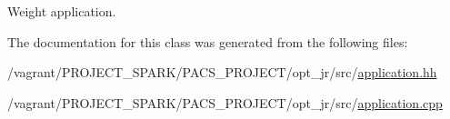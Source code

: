 Weight application. 



The documentation for this class was generated from the following files\-:\begin{DoxyCompactItemize}
\item 
/vagrant/\-P\-R\-O\-J\-E\-C\-T\-\_\-\-S\-P\-A\-R\-K/\-P\-A\-C\-S\-\_\-\-P\-R\-O\-J\-E\-C\-T/opt\-\_\-jr/src/\hyperlink{application_8hh}{application.\-hh}\item 
/vagrant/\-P\-R\-O\-J\-E\-C\-T\-\_\-\-S\-P\-A\-R\-K/\-P\-A\-C\-S\-\_\-\-P\-R\-O\-J\-E\-C\-T/opt\-\_\-jr/src/\hyperlink{application_8cpp}{application.\-cpp}\end{DoxyCompactItemize}
